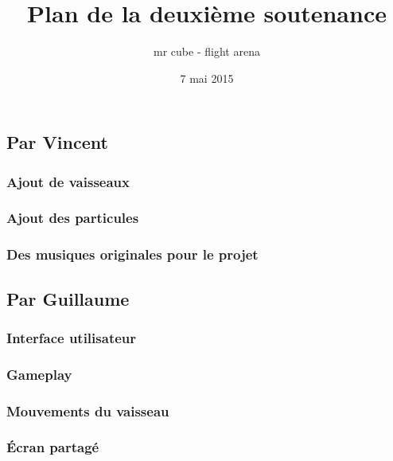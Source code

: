 \documentclass{article}
\title{Plan de la deuxième soutenance}
\author{mr cube - flight arena}
\date{7 mai 2015}
\begin{document}
\maketitle

\section{}

\section{}

\section{}

\subsection{Par Vincent}
\subsubsection{Ajout de vaisseaux}
\subsubsection{Ajout des particules}
\subsubsection{Des musiques originales pour le projet}

\subsection{Par Guillaume}
\subsubsection{Interface utilisateur}
\subsubsection{Gameplay}
\subsubsection{Mouvements du vaisseau}
\subsubsection{Écran partagé}
\end{document}
